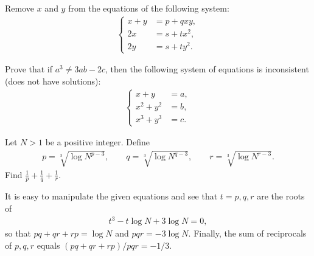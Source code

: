 \documentclass[12pt,a4paper]{memoir}
\theoremstyle{definition}
\begin{document}
\begin{question}
	Remove $x$ and $y$ from the equations of the following system:
	\begin{align*}
		\begin{cases}
			x + y &= p + qxy,\\ 2x &=s+tx^2,\\ 2y &=s+ty^2.
		\end{cases}
	\end{align*}
\end{question}


\begin{question}
	Prove that if $a^3 \neq 3ab-2c$, then the following system of equations is inconsistent (does not have solutions):
	\begin{align*}
		\begin{cases}
			x+y &= a,\\ x^2+y^2 &= b,\\ x^3+y^3 &= c.
		\end{cases}
	\end{align*}
\end{question}


\begin{question}
	Let $N>1$ be a positive integer. Define
	\begin{align*}
		p=\sqrt[3]{\log N^{p-3}}, \qquad q=\sqrt[3]{\log N^{q-3}}, \qquad r=\sqrt[3]{\log N^{r-3}}.
	\end{align*}
	Find $\displaystyle \frac{1}{p}+\frac{1}{q}+\frac{1}{r}$.
\end{question}

\begin{solution}
	It is easy to manipulate the given equations and see that $t=p,q,r$ are the roots of
	\begin{align*}
		t^3 - t\log N + 3\log N = 0,
	\end{align*}
	so that $pq+qr+rp=\log N$ and $pqr=-3\log N$. Finally, the sum of reciprocals of $p,q,r$ equals $(pq+qr+rp)/pqr=-1/3$.
\end{solution}
\end{document}
